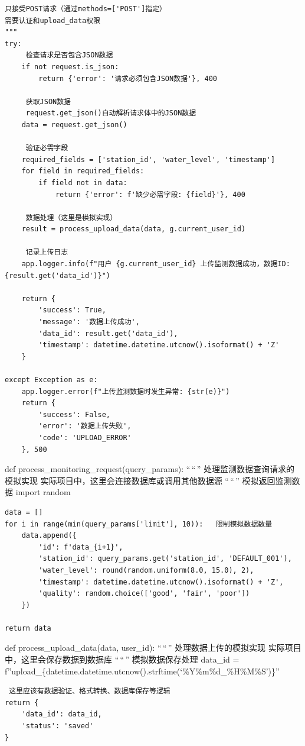 \begin{verbatim}
只接受POST请求（通过methods=['POST']指定）
需要认证和upload_data权限
"""
try:
     检查请求是否包含JSON数据
    if not request.is_json:
        return {'error': '请求必须包含JSON数据'}, 400
    
     获取JSON数据
     request.get_json()自动解析请求体中的JSON数据
    data = request.get_json()
    
     验证必需字段
    required_fields = ['station_id', 'water_level', 'timestamp']
    for field in required_fields:
        if field not in data:
            return {'error': f'缺少必需字段: {field}'}, 400
    
     数据处理（这里是模拟实现）
    result = process_upload_data(data, g.current_user_id)
    
     记录上传日志
    app.logger.info(f"用户 {g.current_user_id} 上传监测数据成功，数据ID: {result.get('data_id')}")
    
    return {
        'success': True,
        'message': '数据上传成功',
        'data_id': result.get('data_id'),
        'timestamp': datetime.datetime.utcnow().isoformat() + 'Z'
    }
    
except Exception as e:
    app.logger.error(f"上传监测数据时发生异常: {str(e)}")
    return {
        'success': False,
        'error': '数据上传失败',
        'code': 'UPLOAD_ERROR'
    }, 500
\end{verbatim}

def process\_monitoring\_request(query\_params): ``\,``\,'' 处理监测数据查询请求的模拟实现 实际项目中，这里会连接数据库或调用其他数据源 ``\,``\,''  模拟返回监测数据 import random

\begin{verbatim}
data = []
for i in range(min(query_params['limit'], 10)):   限制模拟数据数量
    data.append({
        'id': f'data_{i+1}',
        'station_id': query_params.get('station_id', 'DEFAULT_001'),
        'water_level': round(random.uniform(8.0, 15.0), 2),
        'timestamp': datetime.datetime.utcnow().isoformat() + 'Z',
        'quality': random.choice(['good', 'fair', 'poor'])
    })

return data
\end{verbatim}

def process\_upload\_data(data, user\_id): ``\,``\,'' 处理数据上传的模拟实现 实际项目中，这里会保存数据到数据库 ``\,``\,''  模拟数据保存处理 data\_id = f''upload\_\{datetime.datetime.utcnow().strftime(`\%Y\%m\%d\_\%H\%M\%S')\}''

\begin{verbatim}
 这里应该有数据验证、格式转换、数据库保存等逻辑
return {
    'data_id': data_id,
    'status': 'saved'
}
\end{verbatim}

